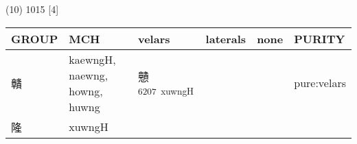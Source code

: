 \documentclass[14pt,a4paper]{scrartcl}
\begin{document}
(10) 1015 {[}4{]}

\begin{longtable}[c]{@{}llllll@{}}
\toprule
\begin{minipage}[b]{0.14\columnwidth}\raggedright\strut
GROUP
\strut\end{minipage} &
\begin{minipage}[b]{0.14\columnwidth}\raggedright\strut
MCH
\strut\end{minipage} &
\begin{minipage}[b]{0.14\columnwidth}\raggedright\strut
velars
\strut\end{minipage} &
\begin{minipage}[b]{0.14\columnwidth}\raggedright\strut
laterals
\strut\end{minipage} &
\begin{minipage}[b]{0.14\columnwidth}\raggedright\strut
none
\strut\end{minipage} &
\begin{minipage}[b]{0.14\columnwidth}\raggedright\strut
PURITY
\strut\end{minipage}\tabularnewline
\midrule
\endhead
\begin{minipage}[t]{0.14\columnwidth}\raggedright\strut
贛
\strut\end{minipage} &
\begin{minipage}[t]{0.14\columnwidth}\raggedright\strut
kaewngH, naewng, howng, huwng
\strut\end{minipage} &
\begin{minipage}[t]{0.14\columnwidth}\raggedright\strut
戇\textsuperscript{6207~xuwngH}
\strut\end{minipage} &
\begin{minipage}[t]{0.14\columnwidth}\raggedright\strut
\strut\end{minipage} &
\begin{minipage}[t]{0.14\columnwidth}\raggedright\strut
\strut\end{minipage} &
\begin{minipage}[t]{0.14\columnwidth}\raggedright\strut
pure:velars
\strut\end{minipage}\tabularnewline
\begin{minipage}[t]{0.14\columnwidth}\raggedright\strut
隆
\strut\end{minipage} &
\begin{minipage}[t]{0.14\columnwidth}\raggedright\strut
xuwngH
\strut\end{minipage} &
\begin{minipage}[t]{0.14\columnwidth}\raggedright\strut

\end{minipage}
\end{longtable}
\end{document}
